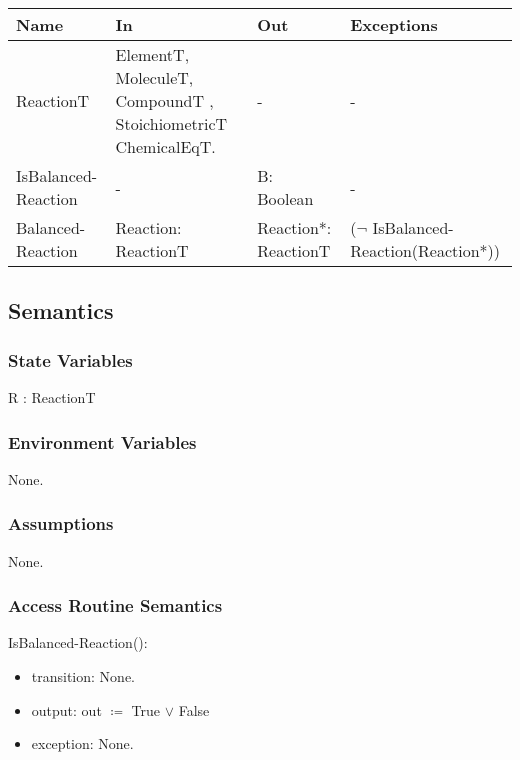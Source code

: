 \documentclass[12pt, titlepage]{article}
\begin{document}
\begin{center}
\begin{tabular}{p{2cm} p{4cm} p{4cm} p{2cm}}
\hline
\textbf{Name} & \textbf{In} & \textbf{Out} & \textbf{Exceptions} \\
\hline
ReactionT & ElementT, MoleculeT, \newline
		CompoundT , \newline StoichiometricT \newline
		ChemicalEqT. & - & - \\
\hline		   
{IsBalanced-Reaction} & - &  B: Boolean  & - \\
\hline
{Balanced-Reaction} & Reaction: \newline ReactionT &  Reaction*: \newline ReactionT  &  ($\neg$ IsBalanced-Reaction(Reaction*))\\
\hline
\end{tabular}
\end{center}

\subsection{Semantics}

\subsubsection{State Variables}

R : ReactionT

\subsubsection{Environment Variables}

None.

\subsubsection{Assumptions}

None.

\subsubsection{Access Routine Semantics}

\noindent IsBalanced-Reaction():
\begin{itemize}
\item transition: None.
\item output: out $\coloneqq$  True  $\lor$ False 
\item exception: None.
\end{itemize}
\end{document}

